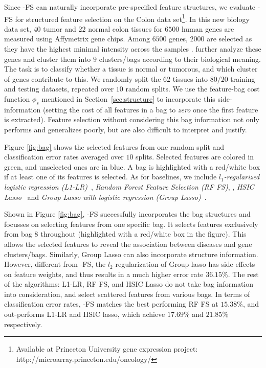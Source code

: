Since \name{}-FS can naturally incorporate pre-specified feature structures, we evaluate \name{}-FS for structured feature selection on the Colon data set\footnote{Available at Princeton University gene expression project: http://microarray.princeton.edu/oncology/}. In this new biology data set, $40$ tumor and $22$ normal colon tissues for $6500$ human genes are measured using Affymetrix gene chips. Among $6500$ genes, $2000$ are selected as they have the highest minimal intensity across the samples \citep{alon1999broad}. \citet{ma2007supervised} further analyze these genes and cluster them into $9$ clusters/bags according to their biological meaning. The task is to classify whether a tissue is normal or tumorous, and which cluster of genes contribute to this. We randomly split the $62$ tissues into $80/20$ training and testing datasets, repeated over $10$ random splits.
We use the feature-bag cost function $\phi_s$ mentioned in Section~\ref{sec:structure} to incorporate this side-information (setting the cost of all features in a bag to \emph{zero} once the first feature is extracted). Feature selection without considering this bag information not only performs and 
generalizes poorly, but are also difficult to interpret and justify. 

Figure \ref{fig:bag} shows the selected features from one random split and classification error rates averaged over $10$ splits. Selected features are colored in green, and unselected ones are in blue. A bag is highlighted with a red/white box if at least one of its features is selected. As for baselines, we include \emph{$l_1$-regularized logistic regression (L1-LR)}~\citep{lee2006efficient,park2007l1}, \emph{Random Forest Feature Selection (RF FS)}, \citep{trevor2009elements}, \emph{HSIC Lasso}~\citep{yamada2012high} and \emph{Group Lasso with logistic regression (Group Lasso)}~\citep{meier2008group}. 

Shown in Figure \ref{fig:bag}, \name{}-FS successfully incorporates the bag structures and focusses on selecting features from one specific bag. It selects features exclusively from bag $8$ throughout (highlighted with a red/white box in the figure). This allows the selected features to reveal the association between diseases and gene clusters/bags. Similarly, Group Lasso can also incorporate structure information. However, different from \name{}-FS, the $l_2$ regularization of Group lasso has side effects on feature weights, and thus results in a much higher error rate $36.15\%$. The rest of the algorithms: L1-LR, RF FS, and HSIC Lasso do not take bag information into consideration, and select scattered features from various bags. In terms of classification error rates, \name{}-FS matches the best performing RF FS at $15.38\%$, and out-performs L1-LR and HSIC lasso, which achieve $17.69\%$ and $21.85\%$ respectively. 

